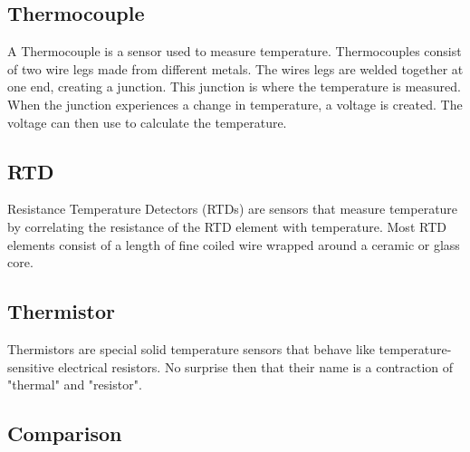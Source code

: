 \documentclass[a4paper,12pt]{report}
\begin{document}
\subsection{Thermocouple}
A Thermocouple is a sensor used to measure temperature. Thermocouples consist of two wire legs made from different metals. 
The wires legs are welded together at one end, creating a junction. This junction is where the temperature is measured. 
When the junction experiences a change in temperature, a voltage is created. 
The voltage can then use to calculate the temperature.

\subsection{RTD}
Resistance Temperature Detectors (RTDs) are sensors that measure temperature by correlating the resistance of the RTD element 
with temperature. Most RTD elements consist of a length of fine coiled wire wrapped around a ceramic or glass core.

\subsection{Thermistor}
Thermistors are special solid temperature sensors that behave like temperature-sensitive electrical resistors. 
No surprise then that their name is a contraction of "thermal" and "resistor".

\subsection{Comparison}
\end{document}
